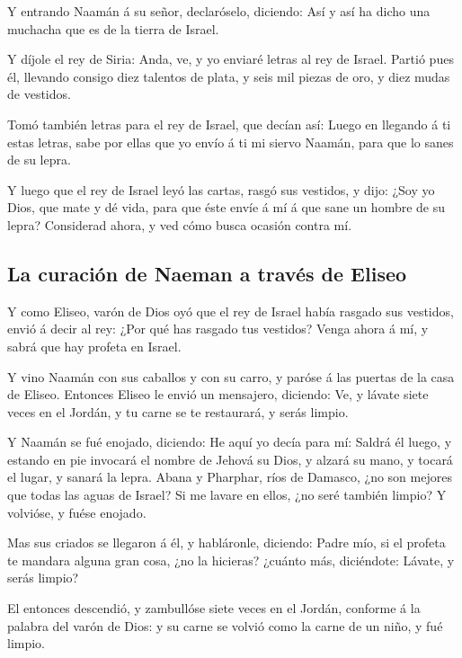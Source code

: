  Y entrando Naamán á su señor, declaróselo, diciendo: Así
y así ha dicho una muchacha que es de la tierra de Israel.

 Y díjole el rey de Siria: Anda, ve, y yo enviaré letras
al rey de Israel. Partió pues él, llevando consigo diez talentos de
plata, y seis mil piezas de oro, y diez mudas de vestidos.

 Tomó también letras para el rey de Israel, que decían
así: Luego en llegando á ti estas letras, sabe por ellas que yo envío á
ti mi siervo Naamán, para que lo sanes de su lepra.

 Y luego que el rey de Israel leyó las cartas, rasgó sus
vestidos, y dijo: ¿Soy yo Dios, que mate y dé vida, para que éste envíe
á mí á que sane un hombre de su lepra? Considerad ahora, y ved cómo
busca ocasión contra mí.

\hypertarget{la-curaciuxf3n-de-naeman-a-travuxe9s-de-eliseo}{%
\subsection{La curación de Naeman a través de
Eliseo}\label{la-curaciuxf3n-de-naeman-a-travuxe9s-de-eliseo}}

 Y como Eliseo, varón de Dios oyó que el rey de Israel
había rasgado sus vestidos, envió á decir al rey: ¿Por qué has rasgado
tus vestidos? Venga ahora á mí, y sabrá que hay profeta en Israel.

 Y vino Naamán con sus caballos y con su carro, y paróse á
las puertas de la casa de Eliseo.  Entonces Eliseo le
envió un mensajero, diciendo: Ve, y lávate siete veces en el Jordán, y
tu carne se te restaurará, y serás limpio.

 Y Naamán se fué enojado, diciendo: He aquí yo decía para
mí: Saldrá él luego, y estando en pie invocará el nombre de Jehová su
Dios, y alzará su mano, y tocará el lugar, y sanará la lepra.
 Abana y Pharphar, ríos de Damasco, ¿no son mejores que
todas las aguas de Israel? Si me lavare en ellos, ¿no seré también
limpio? Y volvióse, y fuése enojado.

 Mas sus criados se llegaron á él, y habláronle,
diciendo: Padre mío, si el profeta te mandara alguna gran cosa, ¿no la
hicieras? ¿cuánto más, diciéndote: Lávate, y serás limpio?

 El entonces descendió, y zambullóse siete veces en el
Jordán, conforme á la palabra del varón de Dios: y su carne se volvió
como la carne de un niño, y fué limpio.


